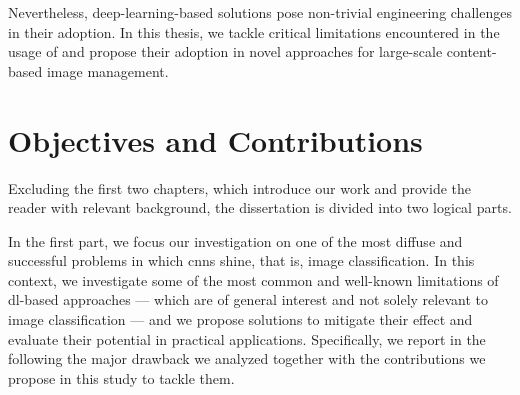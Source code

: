 Nevertheless, deep-learning-based solutions pose non-trivial engineering challenges in their adoption.
In this thesis, we tackle critical limitations encountered in the usage of  and propose their adoption in novel approaches for large-scale content-based image management.

\section{Objectives and Contributions}
Excluding the first two chapters, which introduce our work and provide the reader with relevant background, the dissertation is divided into two logical parts.

In the first part, we focus our investigation on one of the most diffuse and successful problems in which \glspl{cnn} shine, that is, image classification.
In this context, we investigate some of the most common and well-known limitations of \gls{dl}-based approaches --- which are of general interest and not solely relevant to image classification --- and we propose solutions to mitigate their effect and evaluate their potential in practical applications.
Specifically, we report in the following the major drawback we analyzed together with the contributions we propose in this study to tackle them.

